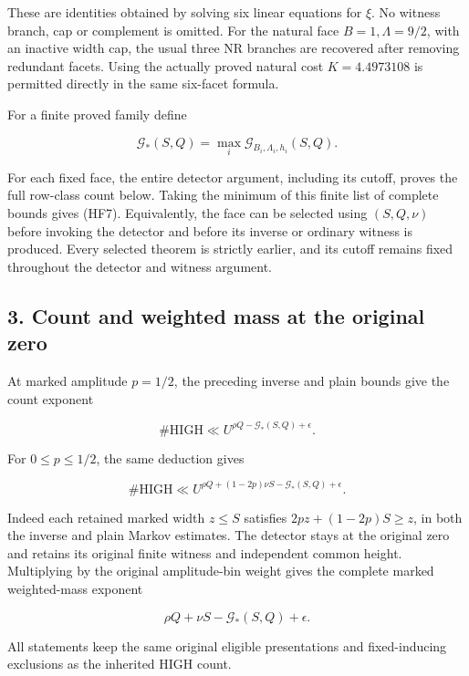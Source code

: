 These are identities obtained by solving six linear equations for \(\xi\). No witness branch, cap or complement is omitted. For the natural face \(B=1,\Lambda=9/2\), with an inactive width cap, the usual three NR branches are recovered after removing redundant facets. Using the actually proved natural cost \(K=4.4973108\) is permitted directly in the same six-facet formula.

For a finite proved family define

\[
 \mathcal G_*(S,Q)=
        \max_i\mathcal G_{B_i,\Lambda_i,h_i}(S,Q).
\tag{HF7}
\]

For each fixed face, the entire detector argument, including its cutoff, proves the full row-class count below. Taking the minimum of this finite list of complete bounds gives (HF7). Equivalently, the face can be selected using \((S,Q,\nu)\) before invoking the detector and before its inverse or ordinary witness is produced. Every selected theorem is strictly earlier, and its cutoff remains fixed throughout the detector and witness argument.

\hypertarget{feedback:count-and-weighted-mass-at-the-original-zero}{%
\subsection{3. Count and weighted mass at the original zero}\label{feedback:count-and-weighted-mass-at-the-original-zero}}

At marked amplitude \(p=1/2\), the preceding inverse and plain bounds give the count exponent

\[
 \#\mathrm{HIGH}\ll
 U^{\rho Q-\mathcal G_*(S,Q)+\epsilon}.
\tag{HF8}
\]

For \(0\le p\le1/2\), the same deduction gives

\[
 \#\mathrm{HIGH}\ll
 U^{\rho Q+(1-2p)\nu S-\mathcal G_*(S,Q)+\epsilon}.
\tag{HF9}
\]

Indeed each retained marked width \(z\le S\) satisfies \(2pz+(1-2p)S\ge z\), in both the inverse and plain Markov estimates. The detector stays at the original zero and retains its original finite witness and independent common height. Multiplying by the original amplitude-bin weight gives the complete marked weighted-mass exponent

\[
 \boxed{\quad
 \rho Q+\nu S-\mathcal G_*(S,Q)+\epsilon .
 \quad}
\tag{HF10}
\]

All statements keep the same original eligible presentations and fixed-inducing exclusions as the inherited HIGH count.

